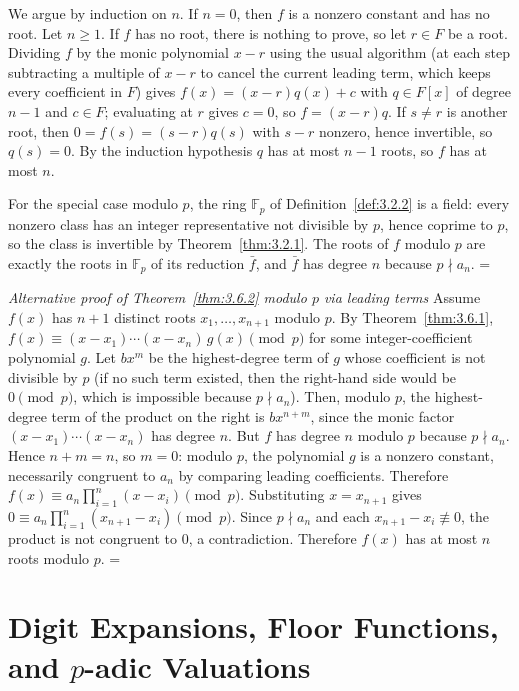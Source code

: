 \documentclass[11pt]{article}
\makeatletter
\theoremstyle{ntstyle}
\let\nt@closedisplay\]
\def\nt@guardedclose{\@ifnextchar\par{\nt@closeafterpar}{\@ifnextchar\end{\postdisplaypenalty\@M\nt@closedisplay}{\nt@closedisplay}}}
\def\nt@closeafterpar\par{\@ifnextchar\par{\nt@closeafterpar}{\@ifnextchar\end{\postdisplaypenalty\@M\nt@closedisplay\par}{\nt@closedisplay\par}}}
\renewenvironment{proof}[1][\proofname]{\par
  \pushQED{\qed}\normalfont\topsep\medskipamount\edef\nt@afterproof{\@endparpenalty=\the\@endparpenalty\relax}\@beginparpenalty\@M\@endparpenalty\@M\let\]\nt@guardedclose\trivlist\item[]\textit{#1\@addpunct{.}} \ignorespaces}{\ifvmode\addpenalty\@M\fi\popQED\nt@afterproof\endtrivlist\@endpefalse}
\newenvironment{altproof}[1][\proofname]{\begin{proof}[#1]}{\end{proof}}
\makeatother
\begin{document}
\begin{proof} We argue by induction on $n$. If $n=0$, then $f$ is a nonzero constant
	and has no root. Let $n\ge1$. If $f$ has no root, there is nothing to prove,
	so let $r\in F$ be a root. Dividing $f$ by the monic polynomial $x-r$ using the
	usual algorithm (at each step subtracting a multiple of $x-r$ to cancel
	the current leading term, which keeps every coefficient in $F$) gives
	$f(x)=(x-r)q(x)+c$ with $q\in F[x]$ of degree $n-1$ and $c\in F$; evaluating
	at $r$ gives $c=0$, so $f=(x-r)q$. If $s\neq r$ is another root, then
	$0=f(s)=(s-r)q(s)$ with $s-r$ nonzero, hence invertible, so $q(s)=0$. By the
	induction hypothesis $q$ has at most $n-1$ roots, so $f$ has at most $n$.

	For the special case modulo $p$, the ring $\mathbb{F}_p$ of Definition~\ref{def:3.2.2} is a field:
	every nonzero class has an integer representative not divisible by $p$,
	hence coprime to $p$, so the class is invertible by
	Theorem~\ref{thm:3.2.1}. The roots of $f$ modulo $p$ are exactly the
	roots in $\mathbb{F}_p$ of its reduction $\bar f$, and $\bar f$ has degree
	$n$ because $p\nmid a_n$.
\end{proof}
\begin{altproof}[Alternative proof of Theorem~\ref{thm:3.6.2} modulo $p$ via leading terms] Assume
$f(x)$ has $n+1$ distinct roots
	$x_1, \ldots, x_{n+1}$ modulo $p$. By Theorem~\ref{thm:3.6.1}, $f(x) \equiv (x
		- x_1) \cdots (x - x_n)\, g(x) \pmod{p}$ for some integer-coefficient
	polynomial $g$. Let $b x^m$ be the highest-degree term of $g$ whose
	coefficient is not divisible by $p$ (if no such term existed, then the
	right-hand side would be $0 \pmod{p}$, which is impossible because $p\nmid a_n$).
	Then, modulo $p$, the highest-degree term of the product on the right is
	$b x^{n+m}$, since the monic factor $(x-x_1)\cdots(x-x_n)$ has degree
	$n$. But $f$ has degree $n$ modulo $p$ because $p\nmid a_n$. Hence
	$n+m=n$, so $m=0$: modulo $p$, the polynomial $g$ is a nonzero constant, necessarily
	congruent to $a_n$ by comparing leading coefficients. Therefore
	$f(x) \equiv a_n \prod_{i=1}^{n}(x - x_i) \pmod{p}$. Substituting
	$x = x_{n+1}$ gives $0 \equiv a_n \prod_{i=1}^{n}(x_{n+1} - x_i)
		\pmod{p}$. Since $p \nmid a_n$ and each $x_{n+1} - x_i \not\equiv 0$,
	the product is not congruent to $0$, a contradiction. Therefore $f(x)$ has
	at most $n$ roots modulo $p$.
\end{altproof}
\clearpage

\section{Digit Expansions, Floor Functions, and \texorpdfstring{$p$}{p}-adic Valuations}
\end{document}
